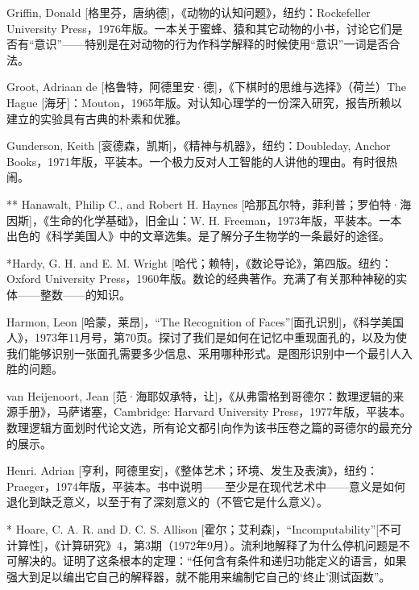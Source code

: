 \begin{thebib}
\begin{biblist}
\item Griffin, Donald [格里芬，唐纳德]，《动物的认知问题》，纽约：Rockefeller University Press，1976年版。一本关于蜜蜂、猿和其它动物的小书，讨论它们是否有“意识”——特别是在对动物的行为作科学解释的时候使用“意识”一词是否合法。

\item Groot, Adriaan de [格鲁特，阿德里安·德]，《下棋时的思维与选择》（荷兰）The Hague [海牙]：Mouton，1965年版。对认知心理学的一份深入研究，报告所赖以建立的实验具有古典的朴素和优雅。

\item Gunderson, Keith [衮德森，凯斯]，《精神与机器》，纽约：Doubleday, Anchor Books，1971年版，平装本。一个极力反对人工智能的人讲他的理由。有时很热闹。

\item[**] Hanawalt, Philip C., and Robert H. Haynes [哈那瓦尔特，菲利普；罗伯特·海因斯]，《生命的化学基础》，旧金山：W. H. Freeman，1973年版，平装本。一本出色的《科学美国人》中的文章选集。是了解分子生物学的一条最好的途径。

\item {*}Hardy, G. H. and E. M. Wright [哈代；赖特]，《数论导论》，第四版。纽约：Oxford University Press，1960年版。数论的经典著作。充满了有关那种神秘的实体——整数——的知识。

\item Harmon, Leon [哈蒙，莱昂]，“The Recognition of Faces”[面孔识别]，《科学美国人》，1973年11月号，第70页。探讨了我们是如何在记忆中重现面孔的，以及为使我们能够识别一张面孔需要多少信息、采用哪种形式。是图形识别中一个最引人入胜的问题。

\item van Heijenoort, Jean [范·海耶奴承特，让]，《从弗雷格到哥德尔：数理逻辑的来源手册》，马萨诸塞，Cambridge: Harvard University Press，1977年版，平装本。数理逻辑方面划时代论文选，所有论文都引向作为该书压卷之篇的哥德尔的最充分的展示。

\item Henri. Adrian [亨利，阿德里安]，《整体艺术；环境、发生及表演》，纽约：Praeger，1974年版，平装本。书中说明——至少是在现代艺术中——意义是如何退化到缺乏意义，以至于有了深刻意义的（不管它是什么意义）。

\item[*] Hoare, C. A. R. and D. C. S. Allison [霍尔；艾利森]，“Incomputability”[不可计算性]，《计算研究》4，第3期（1972年9月）。流利地解释了为什么停机问题是不可解决的。证明了这条根本的定理：“任何含有条件和递归功能定义的语言，如果强大到足以编出它自己的解释器，就不能用来编制它自己的‘终止’测试函数”。


\end{biblist}
\end{thebib}
